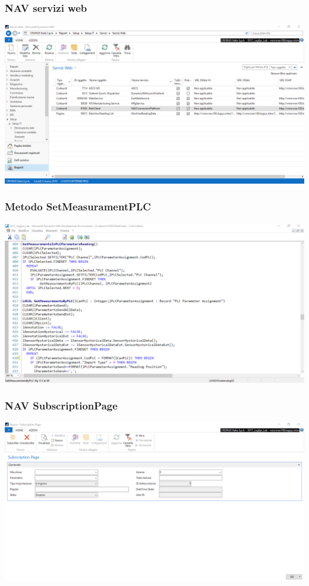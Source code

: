 \documentclass{beamer}
\begin{document}
\begin{frame}
\frametitle{NAV servizi web}
\includegraphics[width=1\textwidth]{images/NAVServiziWeb.png}
\end{frame}

\begin{frame}
\frametitle{Metodo SetMeasuramentPLC}
\includegraphics[width=1\textwidth]{images/NAVSetMesurament.png}
\end{frame}

\begin{frame}
\frametitle{NAV SubscriptionPage}
\includegraphics[width=1\textwidth]{images/NAVSubscriptionPage.png}
\end{frame}
\end{document}
